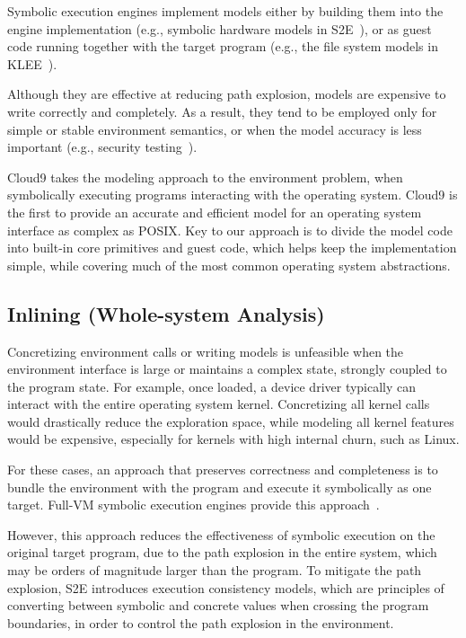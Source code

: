 Symbolic execution engines implement models either by building them into the engine implementation (e.g., symbolic hardware models in S2E~\cite{s2eSystem}), or as guest code running together with the target program (e.g., the file system models in KLEE~\cite{klee}).

Although they are effective at reducing path explosion, models are expensive to write correctly and completely.  As a result, they tend to be employed only for simple or stable environment semantics, or when the model accuracy is less important (e.g., security testing~\cite{aeg}).

Cloud9 takes the modeling approach to the environment problem, when symbolically executing programs interacting with the operating system.  Cloud9 is the first to provide an accurate and efficient model for an operating system interface as complex as POSIX.  Key to our approach is to divide the model code into built-in core primitives and guest code, which helps keep the implementation simple, while covering much of the most common operating system abstractions.

\subsection{Inlining (Whole-system Analysis)}

Concretizing environment calls or writing models is unfeasible when the environment interface is large or maintains a complex state, strongly coupled to the program state.
%
For example, once loaded, a device driver typically can interact with the entire operating system kernel.  Concretizing all kernel calls would drastically reduce the exploration space, while modeling all kernel features would be expensive, especially for kernels with high internal churn, such as Linux.

For these cases, an approach that preserves correctness and completeness is to bundle the environment with the program and execute it symbolically as one target.
%
Full-VM symbolic execution engines provide this approach~\cite{s2e,bitBlaze}.

However, this approach reduces the effectiveness of symbolic execution on the original target program, due to the path explosion in the entire system, which may be orders of magnitude larger than the program.
%
To mitigate the path explosion, S2E introduces execution consistency models, which are principles of converting between symbolic and concrete values when crossing the program boundaries, in order to control the path explosion in the environment.

